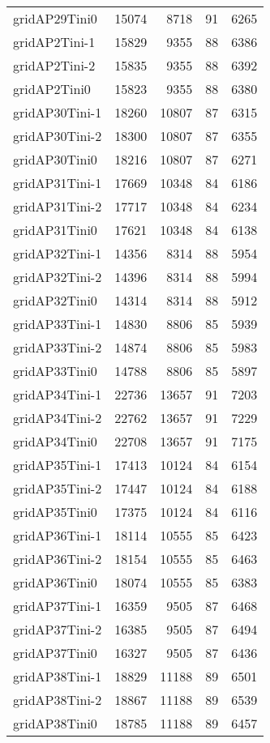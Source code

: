 \begin{longtable}{lrrrr}
gridAP29Tini0 & 15074 & 8718 & 91 & 6265 \\
gridAP2Tini-1 & 15829 & 9355 & 88 & 6386 \\
gridAP2Tini-2 & 15835 & 9355 & 88 & 6392 \\
gridAP2Tini0 & 15823 & 9355 & 88 & 6380 \\
gridAP30Tini-1 & 18260 & 10807 & 87 & 6315 \\
gridAP30Tini-2 & 18300 & 10807 & 87 & 6355 \\
gridAP30Tini0 & 18216 & 10807 & 87 & 6271 \\
gridAP31Tini-1 & 17669 & 10348 & 84 & 6186 \\
gridAP31Tini-2 & 17717 & 10348 & 84 & 6234 \\
gridAP31Tini0 & 17621 & 10348 & 84 & 6138 \\
gridAP32Tini-1 & 14356 & 8314 & 88 & 5954 \\
gridAP32Tini-2 & 14396 & 8314 & 88 & 5994 \\
gridAP32Tini0 & 14314 & 8314 & 88 & 5912 \\
gridAP33Tini-1 & 14830 & 8806 & 85 & 5939 \\
gridAP33Tini-2 & 14874 & 8806 & 85 & 5983 \\
gridAP33Tini0 & 14788 & 8806 & 85 & 5897 \\
gridAP34Tini-1 & 22736 & 13657 & 91 & 7203 \\
gridAP34Tini-2 & 22762 & 13657 & 91 & 7229 \\
gridAP34Tini0 & 22708 & 13657 & 91 & 7175 \\
gridAP35Tini-1 & 17413 & 10124 & 84 & 6154 \\
gridAP35Tini-2 & 17447 & 10124 & 84 & 6188 \\
gridAP35Tini0 & 17375 & 10124 & 84 & 6116 \\
gridAP36Tini-1 & 18114 & 10555 & 85 & 6423 \\
gridAP36Tini-2 & 18154 & 10555 & 85 & 6463 \\
gridAP36Tini0 & 18074 & 10555 & 85 & 6383 \\
gridAP37Tini-1 & 16359 & 9505 & 87 & 6468 \\
gridAP37Tini-2 & 16385 & 9505 & 87 & 6494 \\
gridAP37Tini0 & 16327 & 9505 & 87 & 6436 \\
gridAP38Tini-1 & 18829 & 11188 & 89 & 6501 \\
gridAP38Tini-2 & 18867 & 11188 & 89 & 6539 \\
gridAP38Tini0 & 18785 & 11188 & 89 & 6457 \\

\end{longtable}

